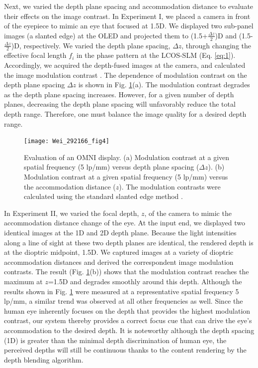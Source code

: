 \documentclass[9pt,twocolumn,twoside]{osajnl}
\begin{document}
Next, we varied the depth plane spacing and accommodation distance to evaluate their effects on the image contrast. In Experiment I, we placed a camera in front of the eyepiece to mimic an eye that focused at 1.5D. We displayed two sub-panel images (a slanted edge) at the OLED and projected them to (1.5+$\frac{\Delta z}{2}$)D and (1.5-$\frac{\Delta z}{2}$)D, respectively. We varied the depth plane spacing, $\Delta z$, through changing the effective focal length $f_i$ in the phase pattern at the LCOS-SLM (Eq. \ref{eq:1}). Accordingly, we acquired the depth-fused images at the camera, and calculated the image modulation contrast \cite{hu2014design}. The dependence of modulation contrast on the depth plane spacing $\Delta z$ is shown in Fig. \ref{fig:4}(a). The modulation contrast degrades as the depth plane spacing increases. However, for a given number of depth planes, decreasing the depth plane spacing will unfavorably reduce the total depth range. Therefore, one must balance the image quality for a desired depth range.\par
\begin{figure}[htbp]
	\centering
	\texttt{[image: Wei\_292166\_fig4]}
	\caption{Evaluation of an OMNI display. (a) Modulation contrast at a given spatial frequency (5 lp/mm) versus depth plane spacing ($\Delta z$). (b) Modulation contrast at a given spatial frequency (5 lp/mm) versus the accommodation distance ($z$). The modulation contrasts were calculated using the standard slanted edge method \cite{hu2014design}.}
	\label{fig:4}
\end{figure} 
In Experiment II, we varied the focal depth, $z$, of the camera to mimic the accommodation distance change of the eye. At the input end, we displayed two identical images at the 1D and 2D depth plane. Because the light intensities along a line of sight at these two depth planes are identical, the rendered depth is at the dioptric midpoint, 1.5D. We captured images at a variety of dioptric accommodation distances and derived the correspondent image modulation contrasts. The result (Fig. \ref{fig:4}(b)) shows that the modulation contrast reaches the maximum at $z$=1.5D and degrades smoothly around this depth. Although the results shown in Fig. \ref{fig:4} were measured at a representative spatial frequency 5 lp/mm, a similar trend was observed at all other frequencies as well. Since the human eye inherently focuses on the depth that provides the highest modulation contrast, our system thereby provides a correct focus cue that can drive the eye’s accommodation to the desired depth. It is noteworthy although the depth spacing (1D) is greater than the minimal depth discrimination of human eye, the perceived depths will still be continuous thanks to the content rendering by the depth blending algorithm.\par
\end{document}
